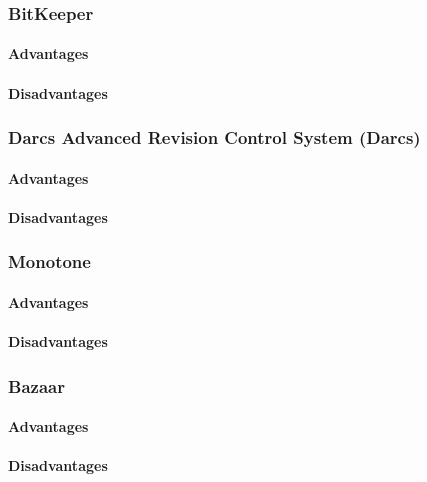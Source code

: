 \subsubsection{BitKeeper}
\paragraph{Advantages}
\paragraph{Disadvantages}
\subsubsection{Darcs Advanced Revision Control System (Darcs)}
\paragraph{Advantages}
\paragraph{Disadvantages}
\subsubsection{Monotone}
\paragraph{Advantages}
\paragraph{Disadvantages}
\subsubsection{Bazaar}
\paragraph{Advantages}
\paragraph{Disadvantages}
